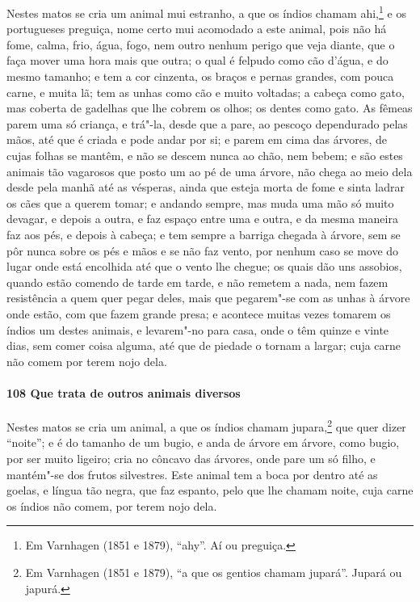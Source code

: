 Nestes matos se cria um animal mui estranho, a que os índios chamam ahi,\footnote{ Em
Varnhagen (1851 e 1879), ``ahy''. Aí ou preguiça.} e os portugueses preguiça, nome certo
mui acomodado a este animal, pois não há fome, calma, frio, água, fogo, nem outro nenhum
perigo que veja diante, que o faça mover uma hora mais que outra; o qual é felpudo como
cão d'água, e do mesmo tamanho; e tem a cor cinzenta, os braços e pernas grandes, com
pouca carne, e muita lã; tem as unhas como cão e muito voltadas; a cabeça como gato, mas
coberta de gadelhas que lhe cobrem os olhos; os dentes como gato. As fêmeas parem uma só
criança, e trá"-la, desde que a pare, ao pescoço dependurado pelas mãos, até que é criada e
pode andar por si; e parem em cima das árvores, de cujas folhas se mantêm, e não se descem
nunca ao chão, nem bebem; e são estes animais tão vagarosos que posto um ao pé de uma
árvore, não chega ao meio dela desde pela manhã até as vésperas, ainda que esteja morta de
fome e sinta ladrar os cães que a querem tomar; e andando sempre, mas muda uma mão só
muito devagar, e depois a outra, e faz espaço entre uma e outra, e da mesma maneira faz
aos pés, e depois à cabeça; e tem sempre a barriga chegada à árvore, sem se pôr nunca
sobre os pés e mãos e se não faz vento, por nenhum caso se move do lugar onde está
encolhida até que o vento lhe chegue; os quais dão uns assobios, quando estão comendo de
tarde em tarde, e não remetem a nada, nem fazem resistência a quem quer pegar deles, mais
que pegarem"-se com as unhas à árvore onde estão, com que fazem grande presa; e acontece
muitas vezes tomarem os índios um destes animais, e levarem"-no para casa, onde o têm
quinze e vinte dias, sem comer coisa alguma, até que de piedade o tornam a largar; cuja
carne não comem por terem nojo dela.

\paragraph{108 Que trata de outros animais diversos}

Nestes matos se cria um animal, a que os índios chamam jupara,\footnote{ Em Varnhagen
(1851 e 1879), ``a que os gentios chamam jupará''. Jupará ou japurá.} que quer dizer
``noite''; e é do tamanho de um bugio, e anda de árvore em árvore, como bugio, por ser
muito ligeiro; cria no côncavo das árvores, onde pare um só filho, e mantém"-se dos frutos
silvestres. Este animal tem a boca por dentro até as goelas, e língua tão negra, que faz
espanto, pelo que lhe chamam noite, cuja carne os índios não comem, por terem nojo dela.

